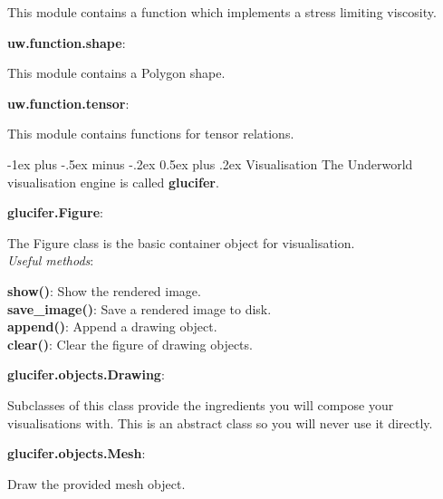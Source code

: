 \documentclass[10pt,landscape]{article}
\makeatletter
\renewcommand{\section}{\@startsection{section}{1}{0mm}%
                                {-1ex plus -.5ex minus -.2ex}%
                                {0.5ex plus .2ex}%
                                {\normalfont\large\bfseries}}
\makeatother
\begin{document}
\begin{multicols}{2}
\begin{addmargin}[1em]{2em}
This module contains a function which implements a stress limiting viscosity.
\end{addmargin}
\vspace{1mm}
\noindent\textbf{uw.function.shape}:
\begin{addmargin}[1em]{2em}
This module contains a Polygon shape.
\end{addmargin}
\vspace{1mm}
\noindent\textbf{uw.function.tensor}:
\begin{addmargin}[1em]{2em}
This module contains functions for tensor relations.
\end{addmargin}
\vspace{1mm}

\section{Visualisation}
The Underworld visualisation engine is called \textbf{glucifer}.
\vspace{1mm}

\noindent\textbf{glucifer.Figure}:
\begin{addmargin}[1em]{2em}
The Figure class is the basic container object for visualisation.\\
\vspace{1mm}
\textit{Useful methods}:\\
\begin{addmargin}[1em]{2em}
\textbf{show()}: Show the rendered image.\\
\textbf{save\_image()}: Save a rendered image to disk.\\
\textbf{append()}: Append a drawing object.\\
\textbf{clear()}: Clear the figure of drawing objects.\\
\end{addmargin}
\end{addmargin}

\vspace{1mm}

\noindent\textbf{glucifer.objects.Drawing}:
\begin{addmargin}[1em]{2em}
Subclasses of this class provide the ingredients you will compose your visualisations with.
This is an abstract class so you will never use it directly.
\end{addmargin}

\noindent\textbf{glucifer.objects.Mesh}:
\begin{addmargin}[1em]{2em}
Draw the provided mesh object.
\end{addmargin}


\end{multicols}
\end{document}
